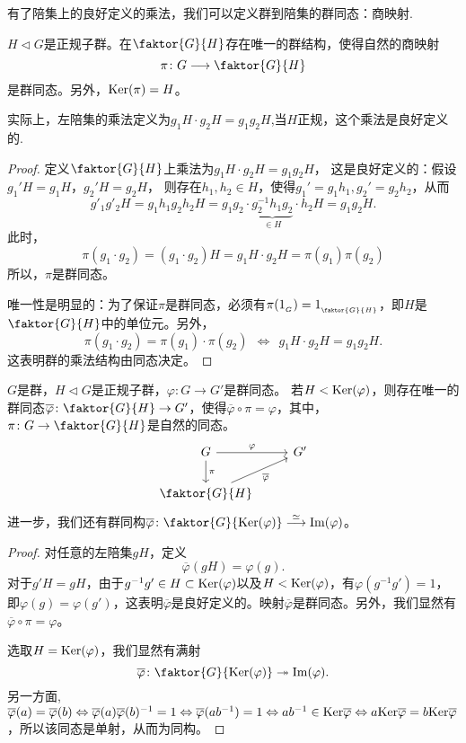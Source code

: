\documentclass[lang=cn,10pt]{elegantbook}
\begin{document}
	有了陪集上的良好定义的乘法，我们可以定义群到陪集的群同态：商映射.
	\begin{theorem}[商映射]
		$H\lhd G$是正规子群。在$\faktor{G}{H}$存在唯一的群结构，使得自然的商映射
		\[\pi\colon G\longrightarrow \faktor{G}{H}\]
		是群同态。另外，${\rm Ker}(\pi)=H$。
		
		实际上，左陪集的乘法定义为$g_1H \cdot g_2H = g_1g_2 H$,当\(H\)正规，这个乘法是良好定义的.
	\end{theorem}
	\begin{proof}
		定义$\faktor{G}{H}$上乘法为$g_1H \cdot g_2H = g_1g_2 H$，
		这是良好定义的：假设$g_1'H=g_1H$，$g_2'H=g_2H$，
		则存在$h_1,h_2\in H$，使得$g_1'=g_1 h_1,g_2'=g_2h_2$，从而
		\[g'_1g'_2 H=g_1 h_1g_2h_2H=g_1 g_2 \cdot \underbrace{g_2^{-1}h_1 g_2}_{\in H} \cdot h_2H=g_1 g_2H.\]
		此时，
		\[\pi(g_1\cdot g_2)=(g_1\cdot g_2)H=g_1H \cdot g_2H=\pi(g_1)\pi(g_2)\]
		所以，$\pi$是群同态。
		
		唯一性是明显的：为了保证$\pi$是群同态，必须有$\pi(1_{_G})=1_{_{\faktor{G}{H}}}$，即$H$是$\faktor{G}{H}$中的单位元。另外，
		\[\pi(g_1\cdot g_2)=\pi(g_1)\cdot \pi(g_2) \ \ \Leftrightarrow \ \ g_1H \cdot g_2H = g_1g_2 H.\]
		这表明群的乘法结构由同态决定。
	\end{proof}
	\begin{theorem}[群同态基本定理]
		$G$是群，$H\lhd G$是正规子群，$\varphi\colon G \rightarrow G'$是群同态。
		若$H<{\rm Ker}(\varphi)$，则存在唯一的群同态$\overline{\varphi}\colon\faktor{G}{H} \rightarrow G'$，使得$\overline{\varphi}\circ\pi=\varphi$，其中，$\pi\colon G\rightarrow \faktor{G}{H}$是自然的同态。
		\[\begin{tikzcd}
			G \arrow[r, "\varphi"] \arrow[d, "\pi"] &  G' \\
			\faktor{G}{H}  \arrow[ur, "\overline{\varphi}",swap] &      \end{tikzcd}
		\]
		进一步，我们还有群同构$\overline{\varphi}\colon\faktor{G}{{\rm Ker}(\varphi)} \stackrel{\simeq}{\longrightarrow} {\rm Im}(\varphi)$。
	\end{theorem}
	\begin{proof}
		对任意的左陪集$gH$，定义\[\overline{\varphi}(gH)=\varphi(g).\]
		对于$g'H=gH$，由于$g^{-1}g'\in H\subset {\rm Ker}(\varphi)$以及$H<{\rm Ker}(\varphi)$，有$\varphi(g^{-1}g')=1$，即$\varphi(g)=\varphi(g')$，这表明$\overline{\varphi}$是良好定义的。映射$\overline{\varphi}$是群同态。另外，我们显然有$\overline{\varphi}\circ\pi=\varphi$。
		
		选取$H={\rm Ker}(\varphi)$，我们显然有满射
		\[\overline{\varphi}\colon \faktor{G}{{\rm Ker}(\varphi)} \twoheadrightarrow  {\rm Im}(\varphi).\]
		另一方面,\(\overline{\varphi}(a)=\overline{\varphi}(b)\Leftrightarrow \overline{\varphi}(a)\overline{\varphi}(b)^{-1}=1\Leftrightarrow \overline{\varphi}(ab^{-1})=1\Leftrightarrow ab^{-1}\in {\rm Ker}\overline{\varphi}\Leftrightarrow a{\rm Ker}\overline{\varphi}=b{\rm Ker}\overline{\varphi}\)，所以该同态是单射，从而为同构。
	\end{proof}
\end{document}
